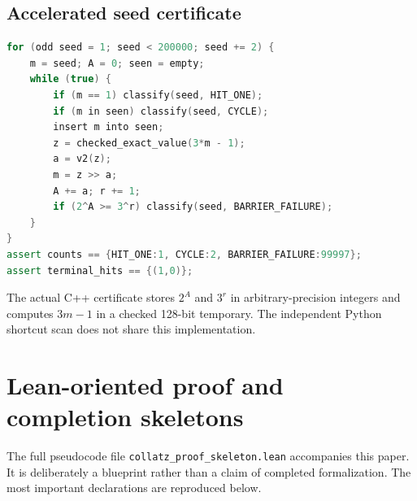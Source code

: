 \documentclass[11pt]{article}
\theoremstyle{definition}
\theoremstyle{remark}
\begin{document}
\subsection{Accelerated seed certificate}

\begin{lstlisting}[language=C++]
for (odd seed = 1; seed < 200000; seed += 2) {
    m = seed; A = 0; seen = empty;
    while (true) {
        if (m == 1) classify(seed, HIT_ONE);
        if (m in seen) classify(seed, CYCLE);
        insert m into seen;
        z = checked_exact_value(3*m - 1);
        a = v2(z);
        m = z >> a;
        A += a; r += 1;
        if (2^A >= 3^r) classify(seed, BARRIER_FAILURE);
    }
}
assert counts == {HIT_ONE:1, CYCLE:2, BARRIER_FAILURE:99997};
assert terminal_hits == {(1,0)};
\end{lstlisting}

The actual C++ certificate stores $2^A$ and $3^r$ in arbitrary-precision
integers and computes $3m-1$ in a checked 128-bit temporary.  The independent
Python shortcut scan does not share this implementation.

\section{Lean-oriented proof and completion skeletons}\label{app:lean}

The full pseudocode file \texttt{collatz\_proof\_skeleton.lean} accompanies
this paper.  It is deliberately a blueprint rather than a claim of completed
formalization.  The most important declarations are reproduced below.


\end{document}
